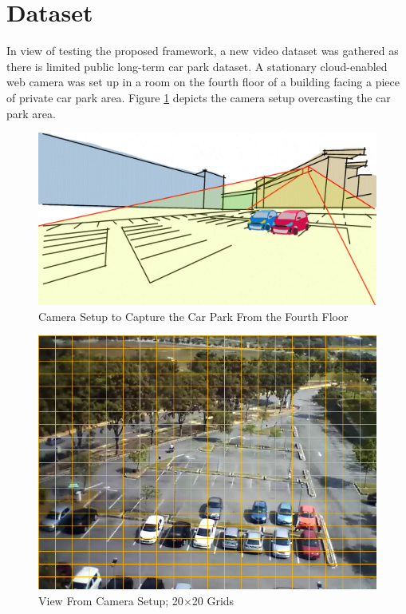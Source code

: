 \section{Dataset}
\label{section:dataset_used}

In view of testing the proposed framework, a new video dataset was gathered as there is limited public long-term car park dataset. A stationary cloud-enabled web camera was set up in a room on the fourth floor of a building facing a piece of private car park area. Figure \ref{fig:camerasetup} depicts the camera setup overcasting the car park area.



\begin{figure}[hbt!]\centering
\includegraphics[width=.8\textwidth]{image/new/fcicarpark2.png}
\caption{Camera Setup to Capture the Car Park From the Fourth Floor}
\label{fig:camerasetup}
\end{figure}


\begin{figure}[!hbt]\centering
\includegraphics[width=.7\textwidth]{image/general/grids.png}
\caption{View From Camera Setup; 20$\times$20 Grids}
\label{fig:viewfromcamera}
\end{figure}


